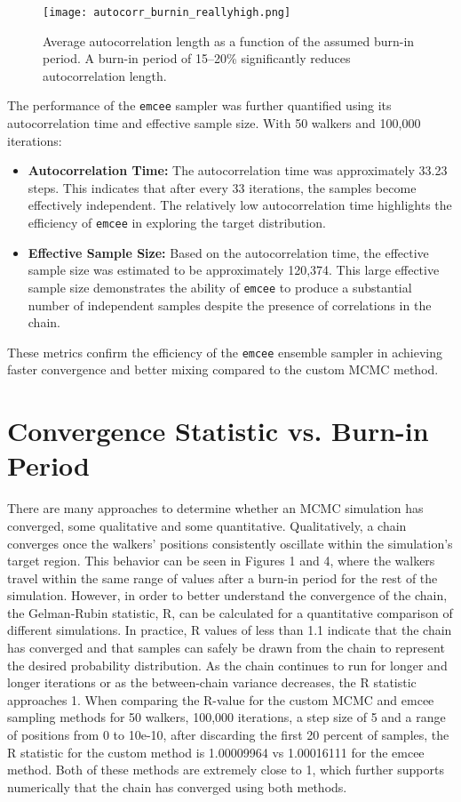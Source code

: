 \documentclass[twocolumn, 11pt]{article}
\begin{document}
\begin{figure}[h!] 
    \centering
    \texttt{[image: autocorr\_burnin\_reallyhigh.png]}
    \caption{Average autocorrelation length as a function of the assumed burn-in period. A burn-in period of 15--20\% significantly reduces autocorrelation length.}
    \label{fig:autocorr_length}
\end{figure}

The performance of the \texttt{emcee} sampler was further quantified using its autocorrelation time and effective sample size. With 50 walkers and 100,000 iterations:
\begin{itemize}
    \item \textbf{Autocorrelation Time:} The autocorrelation time was approximately 33.23 steps. This indicates that after every 33 iterations, the samples become effectively independent. The relatively low autocorrelation time highlights the efficiency of \texttt{emcee} in exploring the target distribution.
    \item \textbf{Effective Sample Size:} Based on the autocorrelation time, the effective sample size was estimated to be approximately 120,374. This large effective sample size demonstrates the ability of \texttt{emcee} to produce a substantial number of independent samples despite the presence of correlations in the chain.
\end{itemize}

These metrics confirm the efficiency of the \texttt{emcee} ensemble sampler in achieving faster convergence and better mixing compared to the custom MCMC method.



\section{Convergence Statistic vs. Burn-in Period}
There are many approaches to determine whether an MCMC simulation has converged, some qualitative and some quantitative. Qualitatively, a chain converges once the walkers' positions consistently oscillate within the simulation's target region. This behavior can be seen in Figures 1 and 4, where the walkers travel within the same range of values after a burn-in period for the rest of the simulation. However, in order to better understand the convergence of the chain, the Gelman-Rubin statistic, R, can be calculated for a quantitative comparison of different simulations. In practice, R values of less than 1.1 indicate that the chain has converged and that samples can safely be drawn from the chain to represent the desired probability distribution. As the chain continues to run for longer and longer iterations or as the between-chain variance decreases, the R statistic approaches 1. When comparing the R-value for the custom MCMC and emcee sampling methods for 50 walkers, 100,000 iterations, a step size of 5 and a range of positions from 0 to 10e-10, after discarding the first 20 percent of samples, the R statistic for the custom method is 1.00009964 vs 1.00016111 for the emcee method. Both of these methods are extremely close to 1, which further supports numerically that the chain has converged using both methods. 
\end{document}
